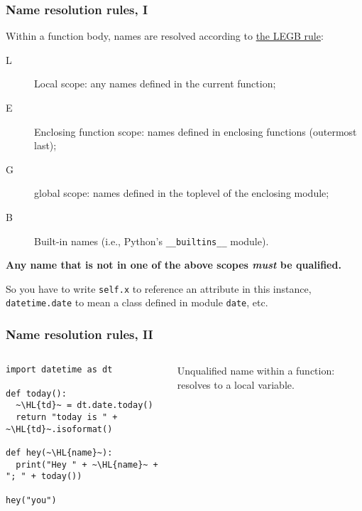 \documentclass[english,serif,mathserif,xcolor=pdftex,dvipsnames,table]{beamer}
\begin{document}
\begin{frame}[fragile]
  \frametitle{Name resolution rules, I}
  \small

  Within a function body, names are resolved according to \href{http://stackoverflow.com/questions/291978/short-description-of-python-scoping-rules/292502#292502}{the LEGB rule}:
  \begin{description}
  \item[L] Local scope: any names defined in the current function;
  \item[E] Enclosing function scope: names defined in enclosing
    functions (outermost last);
  \item[G] global scope: names defined in the toplevel of the enclosing module;
  \item[B] Built-in names (i.e., Python's \texttt{\_\_builtins\_\_} module).
  \end{description}

  \+
  \textbf{Any name that is not in one of the above scopes \emph{must}
    be qualified.}

  \+
  So you have to write \texttt{self.x} to reference an attribute in
  this instance, \texttt{datetime.date} to mean a class defined in module
  \texttt{date}, etc.

\end{frame}


\begin{frame}[fragile]
  \frametitle{Name resolution rules, II}
  \begin{columns}
    \begin{column}[t]{0.6\linewidth}
\begin{lstlisting}
import datetime as dt

def today():
  ~\HL{td}~ = dt.date.today()
  return "today is " + ~\HL{td}~.isoformat()

def hey(~\HL{name}~):
  print("Hey " + ~\HL{name}~ + "; " + today())

hey("you")
\end{lstlisting}
    \end{column}
    \begin{column}[t]{0.4\linewidth}
      \raggedleft
      Unqualified name within a function: resolves to a local variable.
    \end{column}
  \end{columns}
\end{frame}
\end{document}
